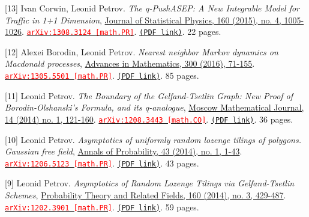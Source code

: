 \begin{etaremune}
\item[{[13]}] 
Ivan Corwin, Leonid Petrov.
\emph{The q-PushASEP: A New Integrable Model for Traffic in 1+1 Dimension}, \href{https://link.springer.com/article/10.1007%2Fs10955-015-1218-9}{Journal of Statistical Physics, 160 (2015), no. 4, 1005-1026}. 
\href{https://arxiv.org/abs/1308.3124}{\texttt{{\textcolor{red}{arXiv:1308.3124 [math.PR]}}}}. \href{https://storage.lpetrov.cc/papers/13-the_qpushasep_a.pdf}{\texttt{(PDF link)}}. 22 pages.





\item[{[12]}] 
Alexei Borodin, Leonid Petrov.
\emph{Nearest neighbor Markov dynamics on Macdonald processes}, \href{http://www.sciencedirect.com/science/article/pii/S0001870816001201}{Advances in Mathematics, 300 (2016), 71-155}. 
\href{https://arxiv.org/abs/1305.5501}{\texttt{{\textcolor{red}{arXiv:1305.5501 [math.PR]}}}}. \href{https://storage.lpetrov.cc/papers/12-nearest_neighbor_markov.pdf}{\texttt{(PDF link)}}. 85 pages.









\item[{[11]}] 
Leonid Petrov.
\emph{The Boundary of the Gelfand-Tsetlin Graph: New Proof of Borodin-Olshanski's Formula, and its q-analogue}, \href{http://www.mathjournals.org/mmj/2014-014-001/2014-014-001-006.html}{Moscow Mathematical Journal, 14 (2014) no. 1, 121-160}. 
\href{https://arxiv.org/abs/1208.3443}{\texttt{{\textcolor{red}{arXiv:1208.3443 [math.CO]}}}}. \href{https://storage.lpetrov.cc/papers/11-the_boundary_of.pdf}{\texttt{(PDF link)}}. 36 pages.



\item[{[10]}] 
Leonid Petrov.
\emph{Asymptotics of uniformly random lozenge tilings of polygons. Gaussian free field}, \href{http://projecteuclid.org/euclid.aop/1415801551}{Annals of Probability, 43 (2014), no. 1, 1-43}. 
\href{https://arxiv.org/abs/1206.5123}{\texttt{{\textcolor{red}{arXiv:1206.5123 [math.PR]}}}}. \href{https://storage.lpetrov.cc/papers/10-asymptotics_of_uniformly.pdf}{\texttt{(PDF link)}}. 43 pages.





\item[{[9]}] 
Leonid Petrov.
\emph{Asymptotics of Random Lozenge Tilings via Gelfand-Tsetlin Schemes}, \href{https://link.springer.com/article/10.1007/s00440-013-0532-x}{Probability Theory and Related Fields, 160 (2014), no. 3, 429-487}. 
\href{https://arxiv.org/abs/1202.3901}{\texttt{{\textcolor{red}{arXiv:1202.3901 [math.PR]}}}}. \href{https://storage.lpetrov.cc/papers/09-asymptotics_of_random.pdf}{\texttt{(PDF link)}}. 59 pages.








\end{etaremune}
